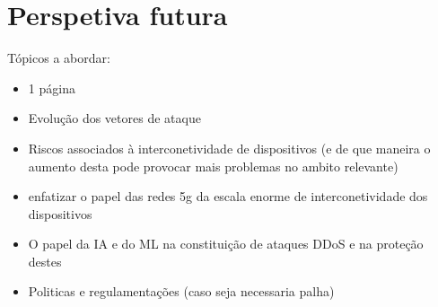 \section{Perspetiva futura}
Tópicos a abordar:
\begin{itemize}
    \item 1 página
    \item Evolução dos vetores de ataque
    \item Riscos associados à interconetividade de dispositivos (e de que maneira o aumento desta pode provocar mais problemas no ambito relevante)
    \item enfatizar o papel das redes 5g da escala enorme de interconetividade dos dispositivos
    \item O papel da IA e do ML na constituição de ataques DDoS e na proteção destes
    \item Politicas e regulamentações (caso seja necessaria palha)
\end{itemize}